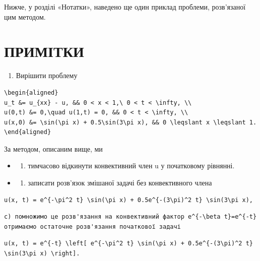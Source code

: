 \documentclass[
  ukrainian,
]{article}
\providecommand{\tightlist}{%
  \setlength{\itemsep}{0pt}\setlength{\parskip}{0pt}}
\begin{document}
Нижче, у розділі «Нотатки», наведено ще один приклад проблеми,
розв'язаної цим методом.

\section{ПРИМІТКИ}\label{ux43fux440ux438ux43cux456ux442ux43aux438}

\begin{enumerate}
\def\labelenumi{\arabic{enumi}.}
\tightlist
\item
  Вирішити проблему
\end{enumerate}

\begin{verbatim}
\begin{aligned}
u_t &= u_{xx} - u, && 0 < x < 1,\ 0 < t < \infty, \\
u(0,t) &= 0,\quad u(1,t) = 0, && 0 < t < \infty, \\
u(x,0) &= \sin(\pi x) + 0.5\sin(3\pi x), && 0 \leqslant x \leqslant 1.
\end{aligned}
\end{verbatim}

За методом, описаним вище, ми

\begin{itemize}
\tightlist
\item
  \begin{enumerate}
  \def\labelenumi{\alph{enumi})}
  \tightlist
  \item
    тимчасово відкинути конвективний член u у початковому рівнянні.
  \end{enumerate}
\item
  \begin{enumerate}
  \def\labelenumi{\alph{enumi})}
  \setcounter{enumi}{1}
  \tightlist
  \item
    записати розв'язок змішаної задачі без конвективного члена
  \end{enumerate}
\end{itemize}

\begin{verbatim}
u(x, t) = e^{-\pi^2 t} \sin(\pi x) + 0.5e^{-(3\pi)^2 t} \sin(3\pi x),
\end{verbatim}

\begin{verbatim}
c) помножимо це розв'язання на конвективний фактор e^{-\beta t}=e^{-t} отримаємо остаточне розв'язання початкової задачі
\end{verbatim}

\begin{verbatim}
u(x, t) = e^{-t} \left[ e^{-\pi^2 t} \sin(\pi x) + 0.5e^{-(3\pi)^2 t} \sin(3\pi x) \right].
\end{verbatim}
\end{document}
